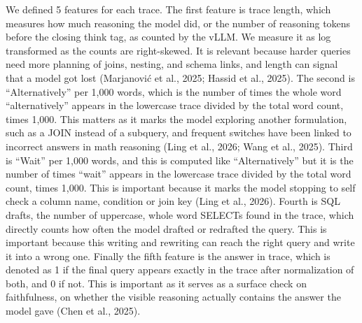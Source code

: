 We defined 5 features for each trace. The first feature is trace length, which measures how much reasoning the model did, or the number of reasoning tokens before the closing think tag, as counted by the vLLM. We measure it as log transformed as the counts are right-skewed. It is relevant because harder queries need more planning of joins, nesting, and schema links, and length can signal that a model got lost (Marjanović et al., 2025; Hassid et al., 2025). The second is ``Alternatively'' per 1,000 words, which is the number of times the whole word ``alternatively'' appears in the lowercase trace divided by the total word count, times 1,000. This matters as it marks the model exploring another formulation, such as a JOIN instead of a subquery, and frequent switches have been linked to incorrect answers in math reasoning (Ling et al., 2026; Wang et al., 2025). Third is ``Wait'' per 1,000 words, and this is computed like ``Alternatively'' but it is the number of times ``wait'' appears in the lowercase trace divided by the total word count, times 1,000. This is important because it marks the model stopping to self check a column name, condition or join key (Ling et al., 2026). Fourth is SQL drafts, the number of uppercase, whole word SELECTs found in the trace, which directly counts how often the model drafted or redrafted the query. This is important because this writing and rewriting can reach the right query and write it into a wrong one. Finally the fifth feature is the answer in trace, which is denoted as 1 if the final query appears exactly in the trace after normalization of both, and 0 if not. This is important as it serves as a surface check on faithfulness, on whether the visible reasoning actually contains the answer the model gave (Chen et al., 2025).

